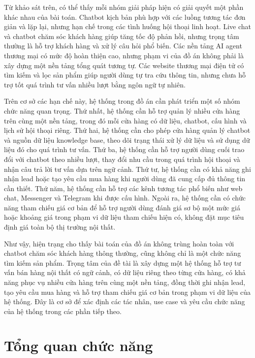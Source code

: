 \documentclass[../DoAn.tex]{subfiles}
\begin{document}
Từ khảo sát trên, có thể thấy mỗi nhóm giải pháp hiện có giải quyết một phần khác nhau của bài toán. Chatbot kịch bản phù hợp với các luồng tương tác đơn giản và lặp lại, nhưng hạn chế trong các tình huống hội thoại linh hoạt. Live chat và chatbot chăm sóc khách hàng giúp tăng tốc độ phản hồi, nhưng trọng tâm thường là hỗ trợ khách hàng và xử lý câu hỏi phổ biến. Các nền tảng AI agent thương mại có mức độ hoàn thiện cao, nhưng phạm vi của đồ án không phải là xây dựng một nền tảng tổng quát tương tự. Các website thương mại điện tử có tìm kiếm và lọc sản phẩm giúp người dùng tự tra cứu thông tin, nhưng chưa hỗ trợ tốt quá trình tư vấn nhiều lượt bằng ngôn ngữ tự nhiên.

Trên cơ sở các hạn chế này, hệ thống trong đồ án cần phát triển một số nhóm chức năng quan trọng. Thứ nhất, hệ thống cần hỗ trợ quản lý nhiều cửa hàng trên cùng một nền tảng, trong đó mỗi cửa hàng có dữ liệu, chatbot, cấu hình và lịch sử hội thoại riêng. Thứ hai, hệ thống cần cho phép cửa hàng quản lý chatbot và nguồn dữ liệu knowledge base, theo dõi trạng thái xử lý dữ liệu và sử dụng dữ liệu đó cho quá trình tư vấn. Thứ ba, hệ thống cần hỗ trợ người dùng cuối trao đổi với chatbot theo nhiều lượt, thay đổi nhu cầu trong quá trình hội thoại và nhận câu trả lời tư vấn dựa trên ngữ cảnh. Thứ tư, hệ thống cần có khả năng ghi nhận lead hoặc tạo yêu cầu mua hàng khi người dùng đã cung cấp đủ thông tin cần thiết. Thứ năm, hệ thống cần hỗ trợ các kênh tương tác phổ biến như web chat, Messenger và Telegram khi được cấu hình. Ngoài ra, hệ thống cần có chức năng tham chiếu giá cơ bản để hỗ trợ người dùng đánh giá sơ bộ một mức giá hoặc khoảng giá trong phạm vi dữ liệu tham chiếu hiện có, không đặt mục tiêu định giá toàn bộ thị trường nội thất.

Như vậy, hiện trạng cho thấy bài toán của đồ án không trùng hoàn toàn với chatbot chăm sóc khách hàng thông thường, cũng không chỉ là một chức năng tìm kiếm sản phẩm. Trọng tâm của đề tài là xây dựng một hệ thống hỗ trợ tư vấn bán hàng nội thất có ngữ cảnh, có dữ liệu riêng theo từng cửa hàng, có khả năng phục vụ nhiều cửa hàng trên cùng một nền tảng, đồng thời ghi nhận lead, tạo yêu cầu mua hàng và hỗ trợ tham chiếu giá cơ bản trong phạm vi dữ liệu của hệ thống. Đây là cơ sở để xác định các tác nhân, use case và yêu cầu chức năng của hệ thống trong các phần tiếp theo.

\section{Tổng quan chức năng}
\label{section:2.2}
\end{document}
